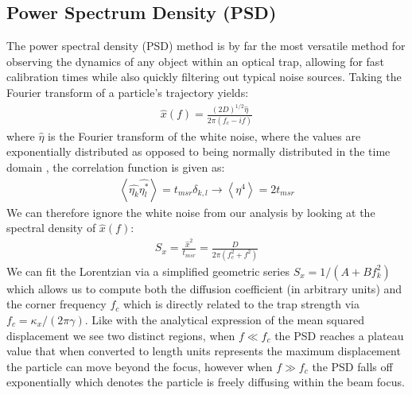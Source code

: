 \documentclass[a4paper,oneside,11pt]{book}
\begin{document}
\subsection{Power Spectrum Density (PSD)}
The power spectral density (PSD) method is by far the most versatile method for observing the dynamics of any object within an optical trap, allowing for fast calibration times while also quickly filtering out typical noise sources. Taking the Fourier transform of a particle's trajectory yields:
\begin{align}
	\hat{x}(f) = \frac{(2D)^{1/2}\hat{\eta}}{2\pi(f_c-if)}
\end{align}
where $\hat{\eta}$ is the Fourier transform of the white noise, where the values are exponentially distributed as opposed to being normally distributed in the time domain \cite{BergSoerensen2004}, the correlation function is given as:
\begin{align}
	\left<\hat{\eta_k}\hat{\eta_l^*}\right> = t_{msr} \delta_{k,l} \rightarrow \left< \eta^4 \right> = 2t_{msr}
\end{align} 
We can therefore ignore the white noise from our analysis by looking at the spectral density of $\hat{x}(f)$: 
\begin{align}
	\label{eq:lorentzian}
	S_x = \frac{\hat{x}^2}{t_{msr}} = \frac{D}{2\pi(f_c^2+f^2)}
\end{align}
We can fit the Lorentzian via a simplified geometric series $S_x = 1/(A+Bf_k^2)$ which allows us to compute both the diffusion coefficient (in arbitrary units) and the corner frequency $f_c$ which is directly related to the trap strength via $f_c = \kappa_x/(2\pi\gamma)$. Like with the analytical expression of the mean squared displacement we see two distinct regions, when $f\ll f_c$ the PSD reaches a plateau value that when converted to length units represents the maximum displacement the particle can move beyond the focus, however when $f\gg f_c$ the PSD falls off exponentially which denotes the particle is freely diffusing within the beam focus.
\end{document}
